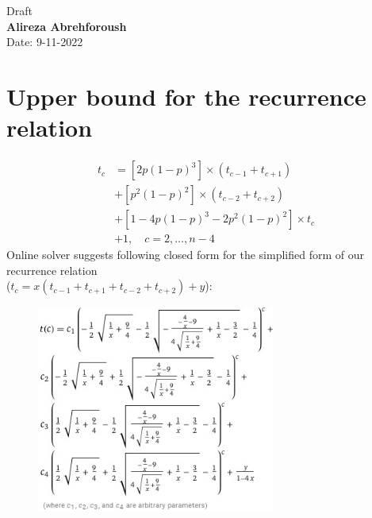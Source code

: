 \documentclass[]{book}
\theoremstyle{definition}
\begin{document}
\begin{center}
{\Large Draft}\\
\textbf{Alireza Abrehforoush}\\ %
Date: 9-11-2022 %
\end{center}
\vspace{0.2 cm}
\section{Upper bound for the recurrence relation}
\begin{equation}
\begin{split}
    t_c &= \left[2p\left(1-p\right)^3\right] \times \left( t_{c-1}+t_{c+1} \right) \\
    &+ \left[p^2\left(1-p\right)^2\right] \times \left( t_{c-2}+t_{c+2} \right) \\
    &+ \left[1-4p\left(1-p\right)^3-2p^2\left(1-p\right)^2\right] \times t_c \\
    &+ 1,  \quad c = 2,\ldots,n-4
\end{split}
\end{equation}
Online solver suggests following closed form for the simplified form of our recurrence relation \\ ($t_c = x\left( t_{c-1} + t_{c+1} + t_{c-2} + t_{c+2} \right) + y$):
\begin{figure}[H]
    \centering
    \includegraphics[width=0.7\textwidth]{figures/lower_bound.jpg}
    \caption{}
\end{figure}
\end{document}
